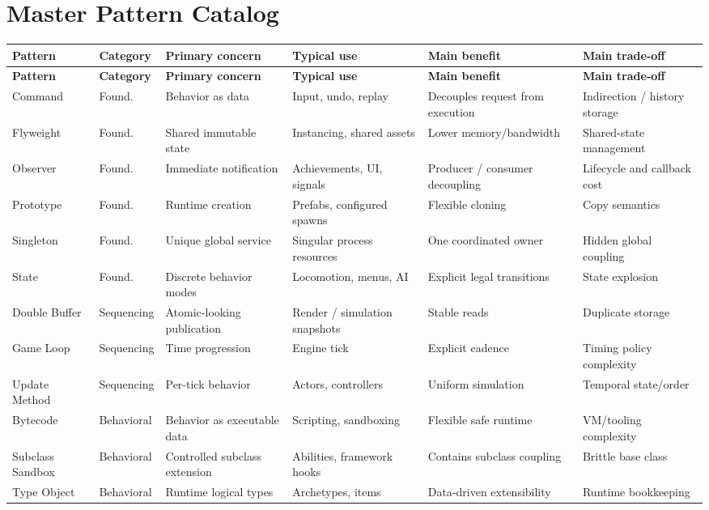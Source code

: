 \documentclass[11pt]{article}
\begin{document}
\section{Master Pattern Catalog}\label{sec:master-catalog}
\small
\begin{longtable}{P{2.10cm}P{1.80cm}P{2.10cm}P{2.50cm}P{2.30cm}P{2.60cm}}
\toprule
\textbf{Pattern} & \textbf{Category} & \textbf{Primary concern} & \textbf{Typical use} & \textbf{Main benefit} & \textbf{Main trade-off}\\
\midrule
\endfirsthead
\toprule
\textbf{Pattern} & \textbf{Category} & \textbf{Primary concern} & \textbf{Typical use} & \textbf{Main benefit} & \textbf{Main trade-off}\\
\midrule
\endhead
Command & Found. & Behavior as data & Input, undo, replay & Decouples request from execution & Indirection / history storage\\
Flyweight & Found. & Shared immutable state & Instancing, shared assets & Lower memory/bandwidth & Shared-state management\\
Observer & Found. & Immediate notification & Achievements, UI, signals & Producer / consumer decoupling & Lifecycle and callback cost\\
Prototype & Found. & Runtime creation & Prefabs, configured spawns & Flexible cloning & Copy semantics\\
Singleton & Found. & Unique global service & Singular process resources & One coordinated owner & Hidden global coupling\\
State & Found. & Discrete behavior modes & Locomotion, menus, AI & Explicit legal transitions & State explosion\\
Double Buffer & Sequencing & Atomic-looking publication & Render / simulation snapshots & Stable reads & Duplicate storage\\
Game Loop & Sequencing & Time progression & Engine tick & Explicit cadence & Timing policy complexity\\
Update Method & Sequencing & Per-tick behavior & Actors, controllers & Uniform simulation & Temporal state/order\\
Bytecode & Behavioral & Behavior as executable data & Scripting, sandboxing & Flexible safe runtime & VM/tooling complexity\\
Subclass Sandbox & Behavioral & Controlled subclass extension & Abilities, framework hooks & Contains subclass coupling & Brittle base class\\
Type Object & Behavioral & Runtime logical types & Archetypes, items & Data-driven extensibility & Runtime bookkeeping\\

\end{longtable}
\end{document}
